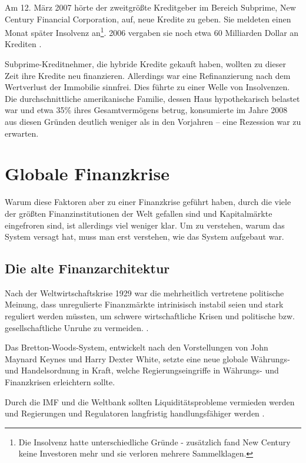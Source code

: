 \documentclass[a4paper,11pt]{report}
\begin{document}
Am 12. M\"arz 2007 h\"orte der zweitgr\"oßte Kreditgeber im Bereich
Subprime, New Century Financial Corporation, auf, neue
Kredite zu geben. Sie meldeten einen Monat sp\"ater Insolvenz 
an\footnote{Die Insolvenz hatte unterschiedliche Gr\"unde -
zus\"atzlich fand New Century keine Investoren mehr
und sie verloren mehrere Sammelklagen.}. 2006 vergaben sie noch
etwa 60 Milliarden Dollar an Krediten \parencite{nytcres}.

Subprime-Kreditnehmer, die hybride Kredite
gekauft haben, wollten zu dieser Zeit ihre Kredite neu finanzieren.
Allerdings war eine Refinanzierung nach dem
Wertverlust der Immobilie sinnfrei. Dies  f\"uhrte zu
einer Welle von Insolvenzen.
Die durchschnittliche amerikanische Familie, dessen Haus
hypothekarisch belastet war und etwa 35\% ihres
Gesamtverm\"ogens betrug, konsumierte im Jahre 2008
aus diesen Gr\"unden deutlich weniger als in den
Vorjahren -- eine Rezession war zu erwarten. 
\parencite[196]{acharyar}

\chapter{Globale Finanzkrise}
Warum diese Faktoren aber zu einer Finanzkrise gef\"uhrt haben,
durch die viele der gr\"oßten Finanzinstitutionen
der Welt gefallen sind und Kapitalm\"arkte eingefroren sind,
ist allerdings viel weniger klar. Um zu verstehen, warum das System
versagt hat, muss man erst verstehen, wie das System aufgebaut war.

\section{Die alte Finanzarchitektur}
Nach der Weltwirtschaftskrise 1929 war die mehrheitlich
vertretene politische Meinung, dass unregulierte
Finanzm\"arkte intrinisisch instabil seien und stark reguliert
werden m\"ussten, um schwere wirtschaftliche Krisen
und politische bzw. gesellschaftliche
Unruhe zu vermeiden. \parencite[S. 563f.]{crottycam}.

Das Bretton-Woods-System,
entwickelt nach den Vorstellungen von John Maynard Keynes
und Harry Dexter White, setzte eine neue globale W\"ahrungs-
und Handelsordnung in Kraft, welche Regierungseingriffe
in W\"ahrungs- und Finanzkrisen erleichtern sollte.

Durch die IMF und die Weltbank sollten Liquidit\"atsprobleme
vermieden werden und Regierungen und Regulatoren langfristig handlungsf\"ahiger werden
\parencite[S. 31f.]{bordo}.
\end{document}
